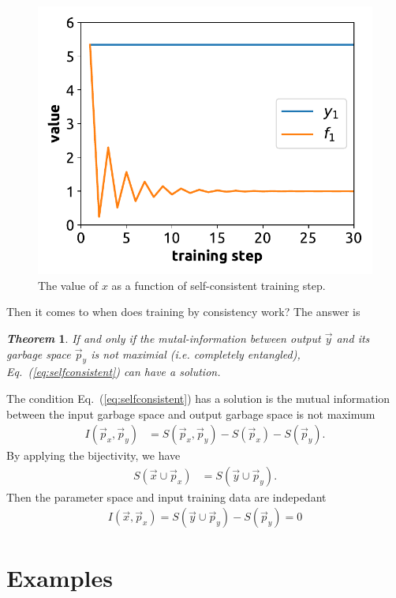 \documentclass[aps,twocolumn,longbibliography,english,superscriptaddress,prr]{revtex4-1}
\newcommand{\<}{\langle}
\renewcommand{\>}{\rangle}
\newcommand{\vx}{{\vec x}}
\newcommand{\vp}{{\vec p}}
\newcommand{\vy}{{\vec y}}
\newcommand{\Eq}[1]{Eq.~(\ref{#1})}
\newtheorem{theorem}{\textit{Theorem}}
\theoremstyle{definition}\newtheorem{definition}{\textit{Definition}}
\begin{document}
\begin{figure}
    \centerline{\includegraphics[width=\columnwidth,trim={0 0 0 0},clip]{images/fig1.pdf}}
    \caption{The value of $x$ as a function of self-consistent training step.}\label{fig:invtrain}
\end{figure}

Then it comes to when does training by consistency work?
The answer is
\begin{theorem}
    If and only if the mutal-information between output $\vy$ and its garbage space $\vp_y$ is not maximial (i.e. completely entangled),
    \Eq{eq:selfconsistent} can have a solution.
\end{theorem}

The condition \Eq{eq:selfconsistent} has a solution is the mutual information between the input garbage space and output garbage space is not maximum
\begin{align}
    I(\vp_x, \vp_y) &= S(\vp_x, \vp_y) - S(\vp_x) - S(\vp_y).
\end{align}
By applying the bijectivity, we have
\begin{align}
    S(\vx \cup \vp_x) &= S(\vy \cup \vp_y).
\end{align}
Then the parameter space and input training data are indepedant
\begin{align}
    I(\vx, \vp_x) = S(\vy \cup \vp_y) - S(\vp_y) = 0
\end{align}


\section{Examples}\label{sec:example}
\end{document}
